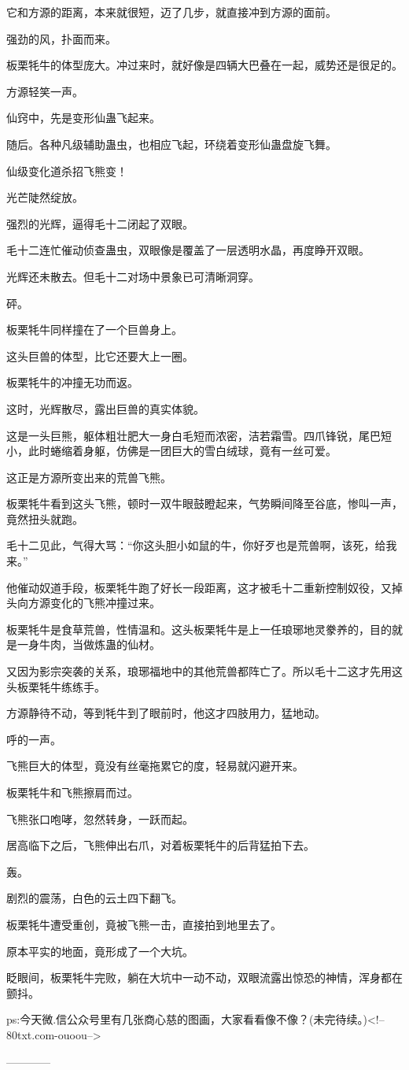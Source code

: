 \begin{this_body}
它和方源的距离，本来就很短，迈了几步，就直接冲到方源的面前。

强劲的风，扑面而来。

板栗牦牛的体型庞大。冲过来时，就好像是四辆大巴叠在一起，威势还是很足的。

方源轻笑一声。

仙窍中，先是变形仙蛊飞起来。

随后。各种凡级辅助蛊虫，也相应飞起，环绕着变形仙蛊盘旋飞舞。

仙级变化道杀招飞熊变！

光芒陡然绽放。

强烈的光辉，逼得毛十二闭起了双眼。

毛十二连忙催动侦查蛊虫，双眼像是覆盖了一层透明水晶，再度睁开双眼。

光辉还未散去。但毛十二对场中景象已可清晰洞穿。

砰。

板栗牦牛同样撞在了一个巨兽身上。

这头巨兽的体型，比它还要大上一圈。

板栗牦牛的冲撞无功而返。

这时，光辉散尽，露出巨兽的真实体貌。

这是一头巨熊，躯体粗壮肥大一身白毛短而浓密，洁若霜雪。四爪锋锐，尾巴短小，此时蜷缩着身躯，仿佛是一团巨大的雪白绒球，竟有一丝可爱。

这正是方源所变出来的荒兽飞熊。

板栗牦牛看到这头飞熊，顿时一双牛眼鼓瞪起来，气势瞬间降至谷底，惨叫一声，竟然扭头就跑。

毛十二见此，气得大骂：“你这头胆小如鼠的牛，你好歹也是荒兽啊，该死，给我来。”

他催动奴道手段，板栗牦牛跑了好长一段距离，这才被毛十二重新控制奴役，又掉头向方源变化的飞熊冲撞过来。

板栗牦牛是食草荒兽，性情温和。这头板栗牦牛是上一任琅琊地灵豢养的，目的就是一身牛肉，当做炼蛊的仙材。

又因为影宗突袭的关系，琅琊福地中的其他荒兽都阵亡了。所以毛十二这才先用这头板栗牦牛练练手。

方源静待不动，等到牦牛到了眼前时，他这才四肢用力，猛地动。

呼的一声。

飞熊巨大的体型，竟没有丝毫拖累它的度，轻易就闪避开来。

板栗牦牛和飞熊擦肩而过。

飞熊张口咆哮，忽然转身，一跃而起。

居高临下之后，飞熊伸出右爪，对着板栗牦牛的后背猛拍下去。

轰。

剧烈的震荡，白色的云土四下翻飞。

板栗牦牛遭受重创，竟被飞熊一击，直接拍到地里去了。

原本平实的地面，竟形成了一个大坑。

眨眼间，板栗牦牛完败，躺在大坑中一动不动，双眼流露出惊恐的神情，浑身都在颤抖。

ps:今天微.信公众号里有几张商心慈的图画，大家看看像不像？(未完待续。)<!--80txt.com-ouoou-->

------------

\end{this_body}

